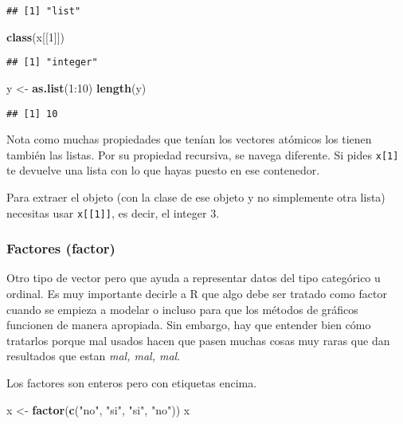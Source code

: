 \documentclass[]{article}
\newenvironment{Shaded}{\begin{snugshade}}{\end{snugshade}}
\newcommand{\KeywordTok}[1]{\textcolor[rgb]{0.13,0.29,0.53}{\textbf{{#1}}}}
\newcommand{\DecValTok}[1]{\textcolor[rgb]{0.00,0.00,0.81}{{#1}}}
\newcommand{\StringTok}[1]{\textcolor[rgb]{0.31,0.60,0.02}{{#1}}}
\newcommand{\NormalTok}[1]{{#1}}
\begin{document}
\begin{verbatim}
## [1] "list"
\end{verbatim}

\begin{Shaded}
\begin{Highlighting}[]
\KeywordTok{class}\NormalTok{(x[[}\DecValTok{1}\NormalTok{]])}
\end{Highlighting}
\end{Shaded}

\begin{verbatim}
## [1] "integer"
\end{verbatim}

\begin{Shaded}
\begin{Highlighting}[]
\NormalTok{y <-}\StringTok{ }\KeywordTok{as.list}\NormalTok{(}\DecValTok{1}\NormalTok{:}\DecValTok{10}\NormalTok{)}
\KeywordTok{length}\NormalTok{(y)}
\end{Highlighting}
\end{Shaded}

\begin{verbatim}
## [1] 10
\end{verbatim}

Nota como muchas propiedades que tenían los vectores atómicos los tienen
también las listas. Por su propiedad recursiva, se navega diferente. Si
pides \texttt{x{[}1{]}} te devuelve una lista con lo que hayas puesto en
ese contenedor.

Para extraer el objeto (con la clase de ese objeto y no simplemente otra
lista) necesitas usar \texttt{x{[}{[}1{]}{]}}, es decir, el integer 3.

\subsubsection{Factores (factor)}\label{factores-factor}

Otro tipo de vector pero que ayuda a representar datos del tipo
categórico u ordinal. Es muy importante decirle a R que algo debe ser
tratado como factor cuando se empieza a modelar o incluso para que los
métodos de gráficos funcionen de manera apropiada. Sin embargo, hay que
entender bien cómo tratarlos porque mal usados hacen que pasen muchas
cosas muy raras que dan resultados que estan \emph{mal, mal, mal}.

Los factores son enteros pero con etiquetas encima.

\begin{Shaded}
\begin{Highlighting}[]
\NormalTok{x <-}\StringTok{ }\KeywordTok{factor}\NormalTok{(}\KeywordTok{c}\NormalTok{(}\StringTok{"no"}\NormalTok{, }\StringTok{"si"}\NormalTok{, }\StringTok{"si"}\NormalTok{, }\StringTok{"no"}\NormalTok{))}
\NormalTok{x}
\end{Highlighting}
\end{Shaded}
\end{document}
